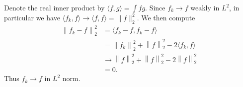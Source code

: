 \begin{exercise}{8.17}
  Denote the real inner product by $\langle f, g \rangle = \int fg$.
  Since $f_k \rightarrow f$ weakly in $L^2$,
  in particular we have
  $\langle f_k, f \rangle \rightarrow \langle f, f \rangle = \| f \|_2^2$.
  We then compute
  \[
    \begin{aligned}
      \left\| f_k - f \right\|_2^2
      &= \langle f_k - f, f_k - f \rangle \\
      &= \left\| f_k \right\|_2^2 + \left\| f \right\|_2^2
      - 2 \langle f_k, f \rangle \\
      &\rightarrow \left\| f \right\|_2^2 + \left\| f \right\|_2^2
      - 2 \left\| f \right\|_2^2 \\
      &= 0.
    \end{aligned}
  \]
  Thus $f_k \rightarrow f$ in $L^2$ norm.
\end{exercise}
